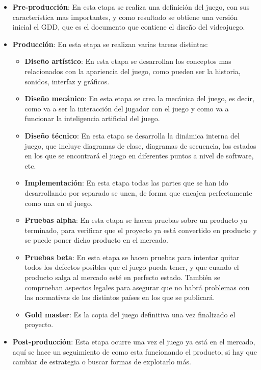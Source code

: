 \begin{itemize}
  \item \textbf{Pre-producción}: En esta etapa se realiza una definición del juego, con sus característica mas importantes, y como resultado se obtiene una versión inicial el GDD, que es el documento que contiene el diseño del videojuego.
  \item \textbf{Producción}: En esta etapa se realizan varias tareas distintas:

  \begin{itemize}
    \item \textbf{Diseño artístico}: En esta etapa se desarrollan los conceptos mas relacionados con la apariencia del juego, como pueden ser la historia, sonidos, interfaz y gráficos.
    \item \textbf{Diseño mecánico}: En esta etapa se crea la mecánica del juego, es decir, como va a ser la interacción del jugador con el juego y como va a funcionar la inteligencia artificial del juego.
    \item \textbf{Diseño técnico}: En esta etapa se desarrolla la dinámica interna del juego, que incluye diagramas de clase, diagramas de secuencia, los estados en los que se encontrará el juego en diferentes puntos a nivel de software, etc.
    \item \textbf{Implementación}: En esta etapa todas las partes que se han ido desarrollando por separado se unen, de forma que encajen perfectamente como una en el juego.
    \item \textbf{Pruebas alpha}: En esta etapa se hacen pruebas sobre un producto ya terminado, para verificar que el proyecto ya está convertido en producto y se puede poner dicho producto en el mercado.
    \item \textbf{Pruebas beta}: En esta etapa se hacen pruebas para intentar quitar todos los defectos posibles que el juego pueda tener, y que cuando el producto salga al mercado esté en perfecto estado. También se comprueban aspectos legales para asegurar que no habrá problemas con las normativas de los distintos países en los que se publicará.
    \item \textbf{Gold master}: Es la copia del juego definitiva una vez finalizado el proyecto.
  \end{itemize}

  \item \textbf{Post-producción}: Esta etapa ocurre una vez el juego ya está en el mercado, aquí se hace un seguimiento de como esta funcionando el producto, si hay que cambiar de estrategia o buscar formas de explotarlo más.

\end{itemize}

